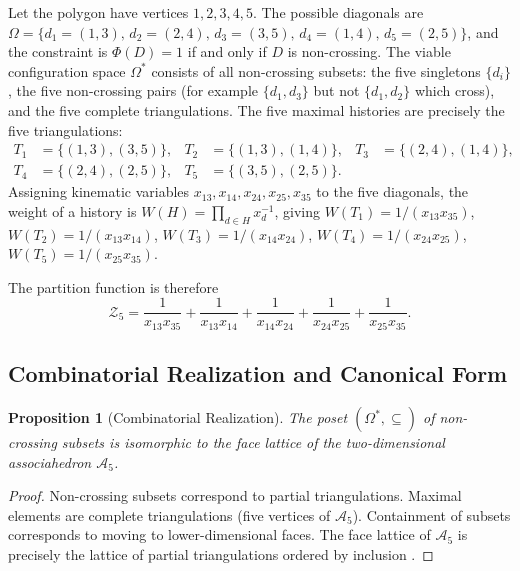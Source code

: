 \documentclass[12pt, oneside]{amsart}
\theoremstyle{plain}
\newtheorem{proposition}[theorem]{Proposition}
\theoremstyle{definition}
\theoremstyle{remark}
\newcommand{\Phif}{\Phi}
\newcommand{\OmKS}{\Omega}
\begin{document}
Let the polygon have vertices $1, 2, 3, 4, 5$. The possible diagonals are $\OmKS = \{d_1 = (1,3),\, d_2 = (2,4),\, d_3 = (3,5),\, d_4 = (1,4),\, d_5 = (2,5)\}$, and the constraint is $\Phif(D) = 1$ if and only if $D$ is non-crossing. The viable configuration space $\OmKS^*$ consists of all non-crossing subsets: the five singletons $\{d_i\}$, the five non-crossing pairs (for example $\{d_1, d_3\}$ but not $\{d_1, d_2\}$ which cross), and the five complete triangulations. The five maximal histories are precisely the five triangulations:
\begin{align*}
  T_1 &= \{(1,3),(3,5)\}, & T_2 &= \{(1,3),(1,4)\}, & T_3 &= \{(2,4),(1,4)\},\\
  T_4 &= \{(2,4),(2,5)\}, & T_5 &= \{(3,5),(2,5)\}.
\end{align*}
Assigning kinematic variables $x_{13}, x_{14}, x_{24}, x_{25}, x_{35}$ to the five diagonals, the weight of a history is $W(H) = \prod_{d \in H} x_d^{-1}$, giving $W(T_1) = 1/(x_{13}x_{35})$, $W(T_2) = 1/(x_{13}x_{14})$, $W(T_3) = 1/(x_{14}x_{24})$, $W(T_4) = 1/(x_{24}x_{25})$, $W(T_5) = 1/(x_{25}x_{35})$.

The partition function is therefore
\begin{equation}
\label{eq:pentagon-Z}
  \mathcal{Z}_5 = \frac{1}{x_{13}x_{35}} + \frac{1}{x_{13}x_{14}} + \frac{1}{x_{14}x_{24}} + \frac{1}{x_{24}x_{25}} + \frac{1}{x_{25}x_{35}}.
\end{equation}

\subsection{Combinatorial Realization and Canonical Form}

\begin{proposition}[Combinatorial Realization]
The poset $(\OmKS^*, \subseteq)$ of non-crossing subsets is isomorphic to the face lattice of the two-dimensional associahedron $\mathcal{A}_5$.
\end{proposition}

\begin{proof}
Non-crossing subsets correspond to partial triangulations. Maximal elements are complete triangulations (five vertices of $\mathcal{A}_5$). Containment of subsets corresponds to moving to lower-dimensional faces. The face lattice of $\mathcal{A}_5$ is precisely the lattice of partial triangulations ordered by inclusion \cite{Stasheff1963}.
\end{proof}
\end{document}
